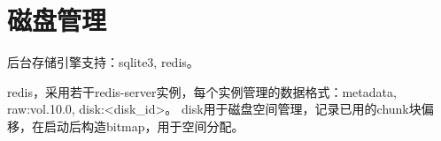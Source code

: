 \chapter{磁盘管理}

后台存储引擎支持：sqlite3, redis。

redis，采用若干redis-server实例，每个实例管理的数据格式：metadata, raw:vol.10.0, disk:<disk_id>。
disk用于磁盘空间管理，记录已用的chunk块偏移，在启动后构造bitmap，用于空间分配。

